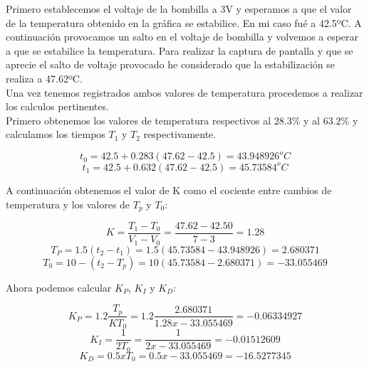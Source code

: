 \documentclass[10pt,a4paper,spanish]{report}
\begin{document}
\noindent
Primero establecemos el voltaje de la bombilla a 3V y esperamos a que el valor de la temperatura obtenido en la gráfica se estabilice. En mi caso fué a 42.5ºC. A continuación provocamos un salto en el voltaje de bombilla y volvemos a esperar a que se estabilice la temperatura. Para realizar la captura de pantalla y que se aprecie el salto de voltaje provocado he considerado que la estabilización se realiza a 47.62ºC. \\

\noindent
Una vez tenemos registrados ambos valores de temperatura procedemos a realizar los calculos pertinentes.\\

\noindent
Primero obtenemos los valores de temperatura respectivos al $28.3\%$ y al $63.2\%$ y calculamos los tiempos $T_1$ y $T_2$ respectivamente.

\begin{displaymath}
	t_0 = 42.5 + 0.283 (47.62 - 42.5) = 43.948926^oC
\end{displaymath}
\begin{displaymath}
	t_1 = 42.5 + 0.632 (47.62 - 42.5) = 45.73584^oC
\end{displaymath}

\noindent
A continuación obtenemos el valor de K como el cociente entre cambios de temperatura y los valores de $T_p$ y $T_0$:

\begin{displaymath}
	K = \frac{T_1 - T_0}{V_1 - V_0} = \frac{47.62 - 42.50}{7 - 3} = 1.28
\end{displaymath}
\begin{displaymath}
	T_P = 1.5(t_2-t_1)=1.5(45.73584-43.948926)=2.680371
\end{displaymath}
\begin{displaymath}
	T_0 = 10-(t_2-T_p)=10(45.73584-2.680371)=-33.055469
\end{displaymath}

\noindent
Ahora podemos calcular $K_P$, $K_I$ y $K_D$:

\begin{displaymath}
	K_P = 1.2 \frac{T_p}{KT_0} = 1.2 \frac{2.680371}{1.28 x -33.055469} = −0.06334927
\end{displaymath}
\begin{displaymath}
	K_I = \frac{1}{2T_0} = \frac{1}{2 x -33.055469} = −0.01512609
\end{displaymath}
\begin{displaymath}
	K_D = 0.5 x T_0 = 0.5 x -33.055469 = −16.5277345
\end{displaymath}
\end{document}
